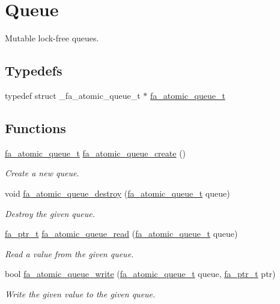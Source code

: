\hypertarget{group___fa_atomic_queue}{\section{Queue}
\label{group___fa_atomic_queue}
}


Mutable lock-\/free queues.  


\subsection*{Typedefs}
\begin{DoxyCompactItemize}
\item 
typedef struct \-\_\-fa\-\_\-atomic\-\_\-queue\-\_\-t $\ast$ \hyperlink{group___fa_atomic_queue_ga31bf61a25a3ef94a5590f863b5448be7}{fa\-\_\-atomic\-\_\-queue\-\_\-t}
\end{DoxyCompactItemize}
\subsection*{Functions}
\begin{DoxyCompactItemize}
\item 
\hyperlink{group___fa_atomic_queue_ga31bf61a25a3ef94a5590f863b5448be7}{fa\-\_\-atomic\-\_\-queue\-\_\-t} \hyperlink{group___fa_atomic_queue_gab64418bd1d44abd7e744450c27013381}{fa\-\_\-atomic\-\_\-queue\-\_\-create} ()
\begin{DoxyCompactList}\small\item\em Create a new queue. \end{DoxyCompactList}\item 
void \hyperlink{group___fa_atomic_queue_ga348fb67019a6c3548449db7f6fdc5497}{fa\-\_\-atomic\-\_\-queue\-\_\-destroy} (\hyperlink{group___fa_atomic_queue_ga31bf61a25a3ef94a5590f863b5448be7}{fa\-\_\-atomic\-\_\-queue\-\_\-t} queue)
\begin{DoxyCompactList}\small\item\em Destroy the given queue. \end{DoxyCompactList}\item 
\hyperlink{group___fa_ga915ddeae99ad7568b273d2b876425197}{fa\-\_\-ptr\-\_\-t} \hyperlink{group___fa_atomic_queue_gab3d856bfd5a77e0fedf138e2c64eb239}{fa\-\_\-atomic\-\_\-queue\-\_\-read} (\hyperlink{group___fa_atomic_queue_ga31bf61a25a3ef94a5590f863b5448be7}{fa\-\_\-atomic\-\_\-queue\-\_\-t} queue)
\begin{DoxyCompactList}\small\item\em Read a value from the given queue. \end{DoxyCompactList}\item 
bool \hyperlink{group___fa_atomic_queue_ga0f28dbe53a428bafc02662c99d71b025}{fa\-\_\-atomic\-\_\-queue\-\_\-write} (\hyperlink{group___fa_atomic_queue_ga31bf61a25a3ef94a5590f863b5448be7}{fa\-\_\-atomic\-\_\-queue\-\_\-t} queue, \hyperlink{group___fa_ga915ddeae99ad7568b273d2b876425197}{fa\-\_\-ptr\-\_\-t} ptr)
\begin{DoxyCompactList}\small\item\em Write the given value to the given queue. \end{DoxyCompactList}\end{DoxyCompactItemize}


